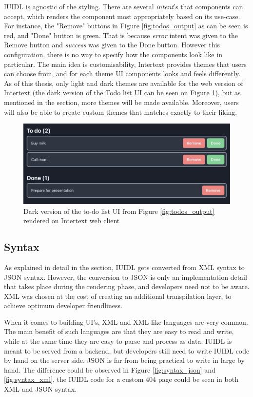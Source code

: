 IUIDL is agnostic of the styling. There are several \textit{intent}'s that components can accept, which renders the component most appropriately based on its use-case. For instance, the "Remove" buttons in Figure \ref{fig:todos_output} as can be seen is red, and "Done" button is green. That is because \textit{error} intent was given to the Remove button and \textit{success} was given to the Done button. However this configuration, there is no way to specify how the components look like in particular. The main idea is customisability, Intertext provides themes that users can choose from, and for each theme UI components looks and feels differently. As of this thesis, only light and dark themes are available for the web version of Intertext (the dark version of the Todo list UI can be seen on Figure \ref{fig:todos_output_dark}), but as mentioned in the  section, more themes will be made available. Moreover, users will also be able to create custom themes that matches exactly to their liking.

\begin{figure}
  \centering
  \includegraphics[width=13cm]{thesis/paper/images/todos_dark.png}
  \caption{Dark version of the to-do list UI from Figure \ref{fig:todos_output} rendered on Intertext web client}%
  \label{fig:todos_output_dark}%
\end{figure}

\subsection{Syntax}

As explained in detail in the  section, IUIDL gets converted from XML syntax to JSON syntax. However, the conversion to JSON is only an implementation detail that takes place during the rendering phase, and developers need not to be aware. XML was chosen at the cost of creating an additional transpilation layer, to achieve optimum developer friendliness. 

When it comes to building UI's, XML and XML-like languages are very common. The main benefit of such languages are that they are easy to read and write, while at the same time they are easy to parse and process as data. IUIDL is meant to be served from a backend, but developers still need to write IUIDL code by hand on the server side. JSON is far from being practical to write in large by hand. The difference could be observed in Figure \ref{fig:syntax_json} and \ref{fig:syntax_xml}, the IUIDL code for a custom 404 page could be seen in both XML and JSON syntax.


